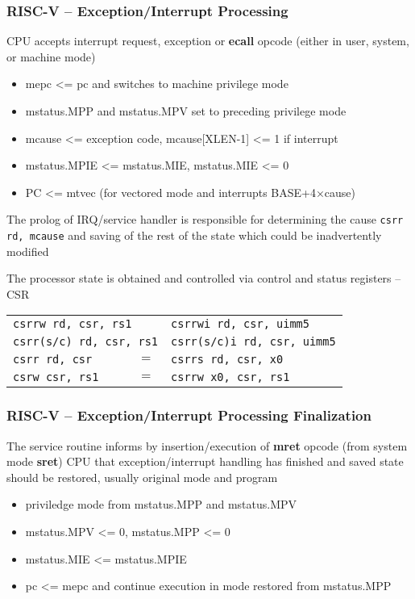 \documentclass{beamer}
\begin{document}
\begin{frame}
\frametitle{RISC-V -- Exception/Interrupt Processing}

CPU accepts interrupt request, exception or \textbf{ecall} opcode (either in user, system, or machine mode)

\begin{itemize}
 \item mepc <= pc and switches to machine privilege mode
 \item mstatus.MPP and mstatus.MPV set to preceding privilege mode
 \item mcause <= exception code, mcause[XLEN-1] <= 1 if interrupt
 \item mstatus.MPIE <= mstatus.MIE, mstatus.MIE <= 0
 \item PC <= mtvec (for vectored mode and interrupts BASE+4×cause)
\end{itemize}

The prolog of IRQ/service handler is responsible for determining
the cause \texttt{csrr rd, mcause} and saving of the rest of
the state which could be inadvertently modified

The processor state is obtained and controlled via control and status registers -- CSR

\begin{tabular}{l c l}
\multicolumn{2}{l}{\texttt{csrrw rd, csr, rs1}} & \texttt{csrrwi rd, csr, uimm5} \\
\multicolumn{2}{l}{\texttt{csrr(s/c) rd, csr, rs1}}  & \texttt{csrr(s/c)i rd, csr, uimm5} \\
\texttt{csrr rd, csr} &  $=$ & \texttt{csrrs rd, csr, x0} \\
\texttt{csrw csr, rs1} & $=$ & \texttt{csrrw x0, csr, rs1} \\
\end{tabular}
\end{frame}

\begin{frame}
\frametitle{RISC-V -- Exception/Interrupt Processing Finalization}

The service routine informs by insertion/execution of \textbf{mret} opcode (from system mode \textbf{sret})
CPU that exception/interrupt handling has finished and saved state should be restored, usually original
mode and program

\begin{itemize}
 \item priviledge mode from mstatus.MPP and mstatus.MPV
 \item mstatus.MPV <= 0, mstatus.MPP <= 0
 \item mstatus.MIE <= mstatus.MPIE
 \item pc <= mepc and continue execution in mode restored from mstatus.MPP
\end{itemize}
\end{frame}
\end{document}
